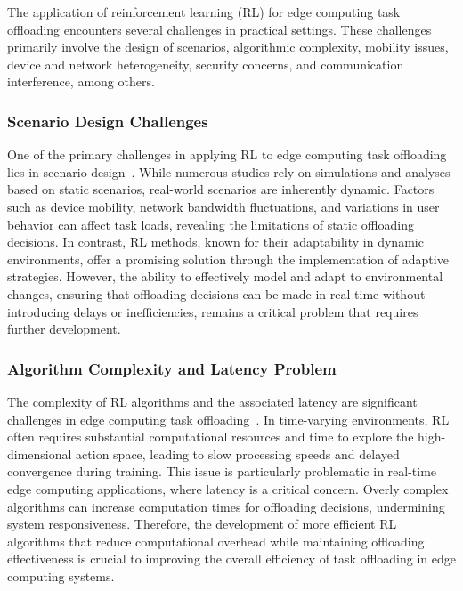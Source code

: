 \documentclass[journal]{IEEEtran}
\begin{document}
The application of reinforcement learning (RL) for edge computing task offloading encounters several challenges in practical settings. These challenges primarily involve the design of scenarios, algorithmic complexity, mobility issues, device and network heterogeneity, security concerns, and communication interference, among others.

\subsubsection{Scenario Design Challenges}
One of the primary challenges in applying RL to edge computing task offloading lies in scenario design~\cite{zhou06}. While numerous studies rely on simulations and analyses based on static scenarios, real-world scenarios are inherently dynamic. Factors such as device mobility, network bandwidth fluctuations, and variations in user behavior can affect task loads, revealing the limitations of static offloading decisions. In contrast, RL methods, known for their adaptability in dynamic environments, offer a promising solution through the implementation of adaptive strategies. However, the ability to effectively model and adapt to environmental changes, ensuring that offloading decisions can be made in real time without introducing delays or inefficiencies, remains a critical problem that requires further development.

\subsubsection{Algorithm Complexity and Latency Problem}
The complexity of RL algorithms and the associated latency are significant challenges in edge computing task offloading~\cite{zhou07}. In time-varying environments, RL often requires substantial computational resources and time to explore the high-dimensional action space, leading to slow processing speeds and delayed convergence during training. This issue is particularly problematic in real-time edge computing applications, where latency is a critical concern. Overly complex algorithms can increase computation times for offloading decisions, undermining system responsiveness. Therefore, the development of more efficient RL algorithms that reduce computational overhead while maintaining offloading effectiveness is crucial to improving the overall efficiency of task offloading in edge computing systems.
\end{document}
